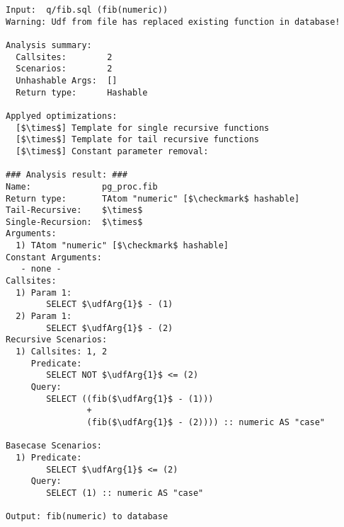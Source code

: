 \footnotesize
\begin{lstlisting}[language={}]
Input:	q/fib.sql (fib(numeric))
Warning: Udf from file has replaced existing function in database!

Analysis summary:
  Callsites:		2
  Scenarios:		2
  Unhashable Args:	[]
  Return type:		Hashable

Applyed optimizations:
  [$\times$] Template for single recursive functions
  [$\times$] Template for tail recursive functions
  [$\times$] Constant parameter removal: 

### Analysis result: ###
Name:              pg_proc.fib
Return type:       TAtom "numeric" [$\checkmark$ hashable]
Tail-Recursive:    $\times$
Single-Recursion:  $\times$
Arguments:
  1) TAtom "numeric" [$\checkmark$ hashable]
Constant Arguments:
   - none -
Callsites:
  1) Param 1:
        SELECT $\udfArg{1}$ - (1) 
  2) Param 1:
        SELECT $\udfArg{1}$ - (2) 
Recursive Scenarios:
  1) Callsites: 1, 2
     Predicate:
        SELECT NOT $\udfArg{1}$ <= (2) 
     Query:
        SELECT ((fib($\udfArg{1}$ - (1)))
                +
                (fib($\udfArg{1}$ - (2)))) :: numeric AS "case" 

Basecase Scenarios:
  1) Predicate:
        SELECT $\udfArg{1}$ <= (2) 
     Query:
        SELECT (1) :: numeric AS "case" 
        
Output:	fib(numeric) to database
\end{lstlisting}